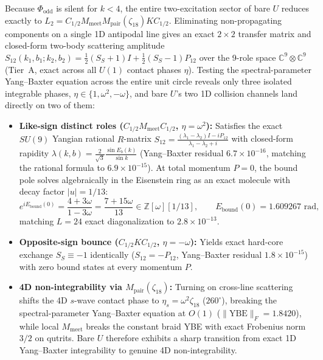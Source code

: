 Because $\Phi_{\mathrm{odd}}$ is silent for $k < 4$, the entire two-excitation sector of bare $U$ reduces exactly to
$L_2 = C_{1/2} M_{\mathrm{meet}} M_{\mathrm{pair}}(\zeta_{18}) K C_{1/2}$. Eliminating non-propagating components on a
single 1D antipodal line gives an exact $2 \times 2$ transfer matrix and closed-form two-body scattering amplitude
$S_{12}(k_1, b_1; k_2, b_2) = \frac{1}{2}(S_S + 1)I + \frac{1}{2}(S_S - 1)P_{12}$ over the 9-role space
$\mathbb{C}^9 \otimes \mathbb{C}^9$ (Tier~A, exact across all $U(1)$ contact phases $\eta$). Testing the
spectral-parameter Yang--Baxter equation \cite{yang1967, baxter1972} across the entire unit circle reveals only three
isolated integrable phases, $\eta \in \{1, \omega^2, -\omega\}$, and bare $U$'s two 1D collision channels land directly
on two of them:
\begin{itemize}[itemsep=2pt]
\item \textbf{Like-sign distinct roles ($C_{1/2} M_{\mathrm{meet}} C_{1/2}$, $\eta = \omega^2$):} Satisfies the exact
$SU(9)$ Yangian rational $R$-matrix $S_{12} = \frac{(\lambda_1 - \lambda_2)I - i P_{12}}{\lambda_1 - \lambda_2 + i}$
with closed-form rapidity $\lambda(k, b) = \frac{2}{\sqrt{3}} \frac{\sin E_b(k)}{\sin k}$ (Yang--Baxter residual
$6.7 \times 10^{-16}$, matching the rational formula to $6.9 \times 10^{-15}$). At total momentum $P = 0$, the bound
pole solves algebraically in the Eisenstein ring as an exact molecule with decay factor $|u| = 1/13$:
\begin{equation}
e^{i E_{\mathrm{bound}}(0)} = \frac{4 + 3\omega}{1 - 3\omega} = \frac{7 + 15\omega}{13} \in \mathbb{Z}[\omega][1/13],
\qquad E_{\mathrm{bound}}(0) = 1.609267\text{ rad},
\label{eq:eisenstein-molecule}
\end{equation}
matching $L = 24$ exact diagonalization to $2.8 \times 10^{-13}$.
\item \textbf{Opposite-sign bounce ($C_{1/2} K C_{1/2}$, $\eta = -\omega$):} Yields exact hard-core exchange
$S_S \equiv -1$ identically ($S_{12} = -P_{12}$, Yang--Baxter residual $1.8 \times 10^{-15}$) with zero bound states at
every momentum $P$.
\item \textbf{4D non-integrability via $M_{\mathrm{pair}}(\zeta_{18})$:} Turning on cross-line scattering shifts the
4D $s$-wave contact phase to $\eta_s = \omega^2 \zeta_{18}$ ($260^\circ$), breaking the spectral-parameter Yang--Baxter
equation at $O(1)$ ($\|\mathrm{YBE}\|_F = 1.8420$), while local $M_{\mathrm{meet}}$ breaks the constant braid YBE with
exact Frobenius norm $3/2$ on qutrits. Bare $U$ therefore exhibits a sharp transition from exact 1D Yang--Baxter
integrability to genuine 4D non-integrability.
\end{itemize}

